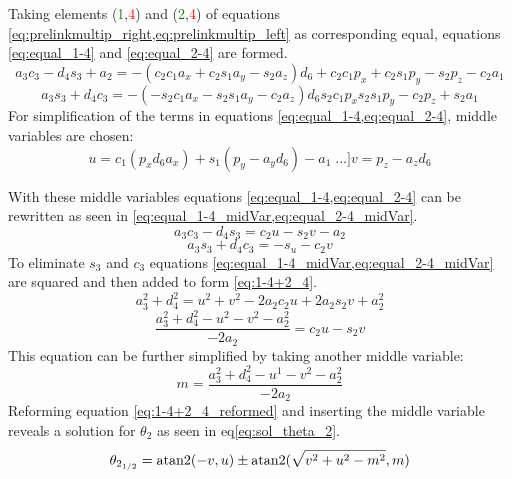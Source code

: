 Taking elements (\textcolor{green}{1},\textcolor{red}{4}) and (\textcolor{green}{2},\textcolor{red}{4}) of equations \cref{eq:prelinkmultip_right,eq:prelinkmultip_left} as corresponding equal, equations \ref{eq:equal_1-4} and \ref{eq:equal_2-4} are formed.
\begin{equation}\label{eq:equal_1-4}
	a_3 c_3 - d_4 s_3 + a_2 = - (c_2 c_1 a_x + c_2 s_1 a_y -s_2 a_z)d_6 + c_2 c_1 p_x + c_2 s_1 p_y -s_2 p_z -c_2 a_1
\end{equation}
\begin{equation}\label{eq:equal_2-4}
	a_3 s_3 +d_4 c_3 = - (- s_2 c_1 a_x - s_2 s_1 a_y - c_2 a_z)d_6 s_2 c_1 p_x s_2 s_1 p_y  -c_2 p_z +s_2 a_1
\end{equation}
For simplification of the terms in equations \cref{eq:equal_1-4,eq:equal_2-4}, middle variables are chosen:
\begin{equation}
	u=c_1 (p_x d_6 a_x ) + s_1 (p_y -a_y d_6)-a_1 \phantom[...]
	v= p_z - a_z d_6
\end{equation}

With these middle variables equations \cref{eq:equal_1-4,eq:equal_2-4} can be rewritten as seen in \cref{eq:equal_1-4_midVar,eq:equal_2-4_midVar}.
\begin{equation}\label{eq:equal_1-4_midVar}
	a_3 c_3 - d_4 s_3 = c_2 u -s_2 v -a_2 
\end{equation}
\begin{equation}\label{eq:equal_2-4_midVar}
	a_3 s_3 + d_4 c_3 = - s_ u - c_2 v
\end{equation}
To eliminate $s_3$ and $c_3$ equations \cref{eq:equal_1-4_midVar,eq:equal_2-4_midVar} are squared and then added to form \ref{eq:1-4+2_4}.
\begin{equation}\label{eq:1-4+2_4}
	a_3^2 +d_4^2 = u^2 +v^2 - 2a_2 c_2 u + 2a_2 s_2 v +a_2^2
\end{equation}
\begin{equation}\label{eq:1-4+2_4_reformed}
	\frac{a_3^2 + d_4^2 - u^2 - v^2 -a_2^2}{-2a_2}= c_2 u -s_2 v
\end{equation}
This equation can be further simplified by taking another middle variable:
\begin{equation*}
	m = \frac{a_3^2 +d_4^2 - u^1 -v^2 - a_2^2}{-2a_2}
\end{equation*}
Reforming equation \ref{eq:1-4+2_4_reformed} and inserting the middle variable reveals a solution for $\theta_2$ as seen in eq\ref{eq:sol_theta_2}.
\begin{equation}\label{eq:sol_theta_2}
	\theta_{2_{1/2}} = \operatorname{atan2} (-v , u)\pm \operatorname{atan2}(\sqrt{v^2 +u^2 - m^2 } , m)
\end{equation}



